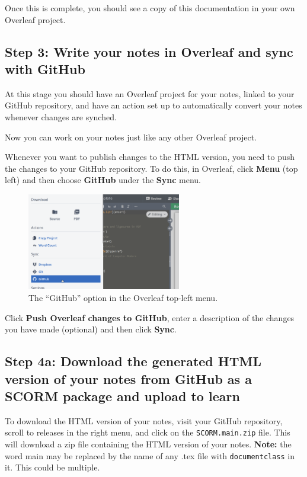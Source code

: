 Once this is complete, you should see a copy of this documentation in your own Overleaf project.


\subsection{Step 3: Write your notes in Overleaf and sync with GitHub}

At this stage you should have an Overleaf project for your notes, linked to your GitHub repository, and have an action set up to automatically convert your notes whenever changes are synched. 

Now you can work on your notes just like any other Overleaf project.

Whenever you want to publish changes to the HTML version, you need to push the changes to your GitHub repository. To do this, in Overleaf, click \textbf{Menu} (top left) and then choose \textbf{GitHub} under the \textbf{Sync} menu.

\begin{figure}[h]
    \centering
    \includegraphics[width=0.6\textwidth]{img/overleaf_sync.png}
    \caption{The ``GitHub'' option in the Overleaf top-left menu.}
    \label{fig:gh-overleaf-sync}
\end{figure}

Click \textbf{Push Overleaf changes to GitHub}, enter a description of the changes you have made (optional) and then click \textbf{Sync}.

\subsection{Step 4a: Download the generated HTML version of your notes from GitHub as a SCORM package and upload to learn}

To download the HTML version of your notes, visit your GitHub repository, scroll to releases in the right menu, and click on the \texttt{SCORM.main.zip} file. This will download a zip file containing the HTML version of your notes. 
\textbf{Note:} the word main may be replaced by the name of any .tex file with \verb|documentclass| in it. This could be multiple.

